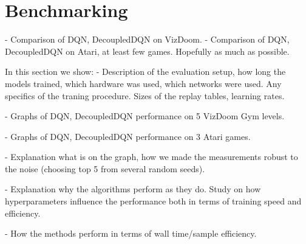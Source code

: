 \section{Benchmarking}

- Comparison of DQN, DecoupledDQN on VizDoom.
- Comparison of DQN, DecoupledDQN on Atari, at least few games. Hopefully as much as possible.

In this section we show:
- Description of the evaluation setup, how long the models trained, which hardware was used,
which networks were used. Any specifics of the traning procedure. Sizes of the replay tables,
learning rates.

- Graphs of DQN, DecoupledDQN performance on 5 VizDoom Gym levels.

- Graphs of DQN, DecoupledDQN performance on 3 Atari games.

- Explanation what is on the graph, how we made the measurements robust to the noise (choosing top 5
from several random seeds).

- Explanation why the algorithms perform as they do. Study on how hyperparameters influence
the performance both in terms of training speed and efficiency.

- How the methods perform in terms of wall time/sample efficiency.
